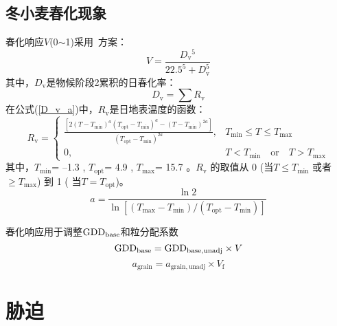 \subsection{冬小麦春化现象}
春化响应$V$(0$\sim$1)采用~\citet{streck2003incorporating}方案：
\begin{equation}
  V=\frac{D_{\mathrm{v}}{ }^{5}}{22.5^{5}+D_{\mathrm{v}}^{5}}
\end{equation}
其中，$D_{\mathrm {v}} $是物候阶段2累积的日春化率：
\begin{equation}\label{D_v_a}
  D_{\mathrm{v}}=\sum R_{\mathrm{v}}
\end{equation}
在公式(\ref{D_v_a})中，$R_{\mathrm{v}}$是日地表温度的函数：
\begin{equation}
  R_{\mathrm{v}} = \begin{cases}
    \frac{\left[2\left(T-T_{\mathrm{min}}\right)^{a}\left(T_{\mathrm{opt}}-T_{\mathrm{min}}\right)^{a} - \left(T-T_{\mathrm{min}}\right)^{2a}\right]}{\left(T_{\mathrm{opt}}-T_{\mathrm{min}}\right)^{2a}}, &T_{\mathrm{min}} \leqslant T \leqslant T_{\mathrm{max}} \\
    0,  &T<T_{\mathrm{min}} \quad  \text{or} \quad T>T_{\mathrm{max}}
  \end{cases}
\end{equation}
其中，$T_{\mathrm{min}}$= –1.3 \textcelsius, $T_{\mathrm{opt}}$= 4.9 \textcelsius, $T_{\mathrm{max}}$= 15.7 \textcelsius。$ R_{\mathrm {v}} $ 的取值从 0 (当$ T\leqslant T_{\mathrm{min}}$ 或者 $ \geqslant  T_{\mathrm{max}}$) 到 1 ( 当$T=T_{\mathrm{opt}}$)。
\begin{equation}
  a=\frac{\ln 2}{\ln \left[\left(T_{\max }-T_{\min }\right) /\left(T_{\mathrm{o p t}}-T_{\min }\right)\right]}
\end{equation}

春化响应用于调整${\rm GDD}_{\mathrm{base}}$和粒分配系数
\begin{equation}
  {\rm GDD}_{\mathrm{base}}={\rm GDD}_{\mathrm{b a s e,  { unadj }}} \times V
\end{equation}
\begin{equation}
  a_{\mathrm{ {grain }}}=a_{\mathrm{ {grain,unadj }}} \times V_{\mathrm{f}}
\end{equation}


\section{胁迫}
